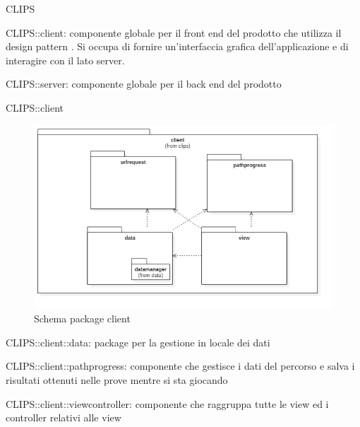 \begin{componente}{CLIPS}
\begin{compPackageContenuti}
\item CLIPS::client: componente globale per il front end del prodotto che utilizza il design pattern . Si occupa di fornire un'interfaccia grafica dell'applicazione e di interagire con il lato server.
\item CLIPS::server: componente globale per il back end del prodotto
\end{compPackageContenuti}
\end{componente}
\begin{componente}{CLIPS::client}
\begin{figure}[h!] 
\centering 
\includegraphics[scale=0.4]{img/package/png/client.png} 
\caption{Schema package client} 
 \end{figure} 
\begin{compPackageContenuti}
\item CLIPS::client::data: package per la gestione in locale dei dati
\item CLIPS::client::pathprogress: componente che gestisce i dati del percorso e salva i risultati ottenuti nelle prove mentre si sta giocando
\item CLIPS::client::viewcontroller: componente che raggruppa tutte le view ed i controller relativi alle view
\end{compPackageContenuti}
\end{componente}
